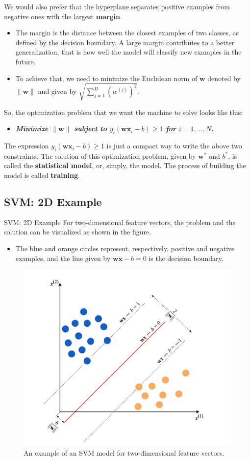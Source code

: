 \documentclass[10pt,dvipsnames]{beamer}
\begin{document}
\begin{frame}
    We would also prefer that the hyperplane separates positive examples from negative ones with the largest \textbf{margin}.
    \begin{itemize}
        \item The margin is the distance between the closest examples of two classes, as defined by the decision boundary. A large margin contributes to a better generalization, that is how well the model will classify new examples in the future.
        \item  To achieve that, we need to minimize the Euclidean norm of $\mathbf{w}$ denoted by $\|\mathbf{w}\|$ and given by $\sqrt{\sum_{j=1}^{D}\left(w^{(j)}\right)^{2}}$.
    \end{itemize}


    So, the optimization problem that we want the machine to solve looks like this:
    \begin{itemize}
        \item  \textbf{\textit{Minimize $\|\mathbf{w}\|$ subject to $y_{i}\left(\mathbf{w} \mathbf{x}_{i}-b\right) \geq 1$ for $i=1, \ldots, N$.}}
    \end{itemize}


    The expression $y_{i}\left(\mathbf{w} \mathbf{x}_{i}-b\right) \geq 1$ is just a compact way to write the above two constraints. The solution of this optimization problem, given by $\mathbf{w}^{*}$ and $b^{*}$, is called the \textbf{statistical model}, or, simply, the model. The process of building the model is called \textbf{training}.
\end{frame}

\subsection{SVM: 2D Example}
\begin{frame}{SVM: 2D Example}
    For two-dimensional feature vectors, the problem and the solution can be visualized as shown in the figure.
    \begin{itemize}
        \item The blue and orange circles represent, respectively, positive and negative examples, and the line given by $\mathbf{w} \mathbf{x}-b=0$ is the decision boundary.
    \end{itemize}
    \begin{figure}[ht]
        \centering
        \includegraphics[width=0.5\linewidth]{imgs/intro_1.png}
        \caption{An example of an SVM model for two-dimensional feature vectors.}
    \end{figure}

\end{frame}
\end{document}
